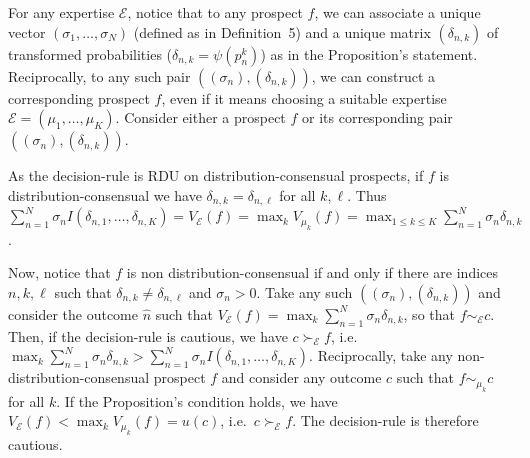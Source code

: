 \documentclass[12pt,a4paper]{article}
\newenvironment{original}
  {\par\noindent\ignorespaces}
  {\par}
\begin{document}
\begin{original}
For any expertise $\mathcal{E}$, notice that to any prospect $f$, we can associate a unique vector $(\sigma_{1}, \dots, \sigma_{N})$ (defined as in Definition~5) and a unique matrix $(\delta_{n,k})$ of transformed probabilities ($\delta_{n,k} = \psi(p^{k}_{n})$) as in the Proposition's statement. Reciprocally, to any such pair $((\sigma_{n}), (\delta_{n,k}))$, we can construct a corresponding prospect $f$, even if it means choosing a suitable expertise $\mathcal{E} = (\mu_{1}, \dots, \mu_{K})$. Consider either a prospect $f$ or its corresponding pair $((\sigma_{n}), (\delta_{n,k}))$.

As the decision-rule is RDU on distribution-consensual prospects, if $f$ is distribution-consensual we have $\delta_{n,k} = \delta_{n,\ell}$ for all $k,\ell$. Thus $\sum_{n=1}^{N} \sigma_{n} I(\delta_{n,1}, \dots, \delta_{n,K}) = V_{\mathcal{E}}(f) = \max_{k} V_{\mu_{k}}(f) = \max_{1 \leq k \leq K} \sum_{n=1}^{N} \sigma_{n} \delta_{n,k}$.

Now, notice that $f$ is non distribution-consensual if and only if there are indices $n, k, \ell$ such that $\delta_{n,k} \neq \delta_{n,\ell}$ and $\sigma_{n} > 0$. Take any such $((\sigma_{n}), (\delta_{n,k}))$ and consider the outcome $\hat{n}$ such that $V_{\mathcal{E}}(f) = \max_{k} \sum_{n=1}^{N} \sigma_{n} \delta_{n,k}$, so that $f \sim_{\mathcal{E}} c$. Then, if the decision-rule is cautious, we have $c \succ_{\mathcal{E}} f$, i.e.\ $\max_{k} \sum_{n=1}^{N} \sigma_{n} \delta_{n,k} > \sum_{n=1}^{N} \sigma_{n} I(\delta_{n,1}, \dots, \delta_{n,K})$. Reciprocally, take any non-distribution-consensual prospect $f$ and consider any outcome $c$ such that $f \sim_{\mu_{k}} c$ for all $k$. If the Proposition's condition holds, we have $V_{\mathcal{E}}(f) < \max_{k} V_{\mu_{k}}(f) = u(c)$, i.e.\ $c \succ_{\mathcal{E}} f$. The decision-rule is therefore cautious.
\end{original}
\end{document}
